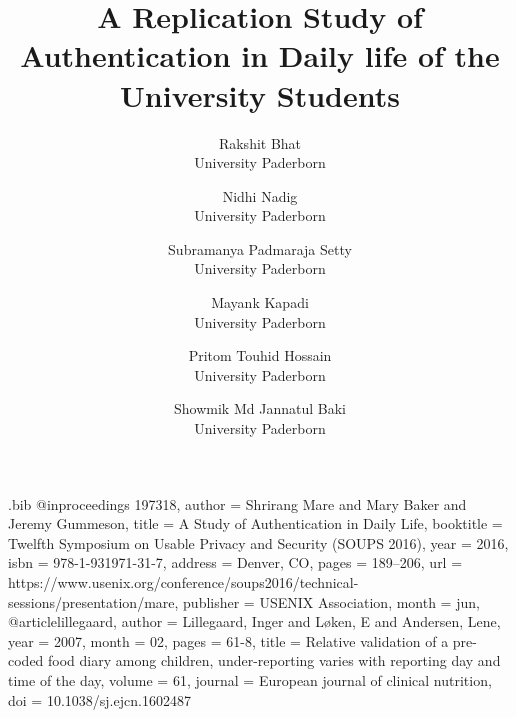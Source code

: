 \usepackage{filecontents}

\begin{filecontents}{\jobname.bib}
@inproceedings {197318,
author = {Shrirang Mare and Mary Baker and Jeremy Gummeson},
title = {A Study of Authentication in Daily Life},
booktitle = {Twelfth Symposium on Usable Privacy and Security (SOUPS 2016)},
year = {2016},
isbn = {978-1-931971-31-7},
address = {Denver, CO},
pages = {189--206},
url = {https://www.usenix.org/conference/soups2016/technical-sessions/presentation/mare},
publisher = {USENIX Association},
month = jun,
}
@article{lillegaard,
author = {Lillegaard, Inger and Løken, E and Andersen, Lene},
year = {2007},
month = {02},
pages = {61-8},
title = {Relative validation of a pre-coded food diary among children, under-reporting varies with reporting day and time of the day},
volume = {61},
journal = {European journal of clinical nutrition},
doi = {10.1038/sj.ejcn.1602487}
}
\end{filecontents}



\date{}

\title{\Large \bf A Replication Study of Authentication in Daily life of the University Students}

\def\plainauthor{Author name(s) for PDF metadata. Don't forget to anonymize for submission!}

\author{
{\rm Rakshit Bhat}\\
University Paderborn
\and
{\rm Nidhi Nadig}\\
University Paderborn
\and
{\rm Subramanya Padmaraja Setty}\\
University Paderborn
\and
{\rm Mayank Kapadi}\\
University Paderborn
\and
{\rm Pritom Touhid Hossain}\\
University Paderborn
\and
{\rm Showmik Md Jannatul Baki}\\
University Paderborn
} %

